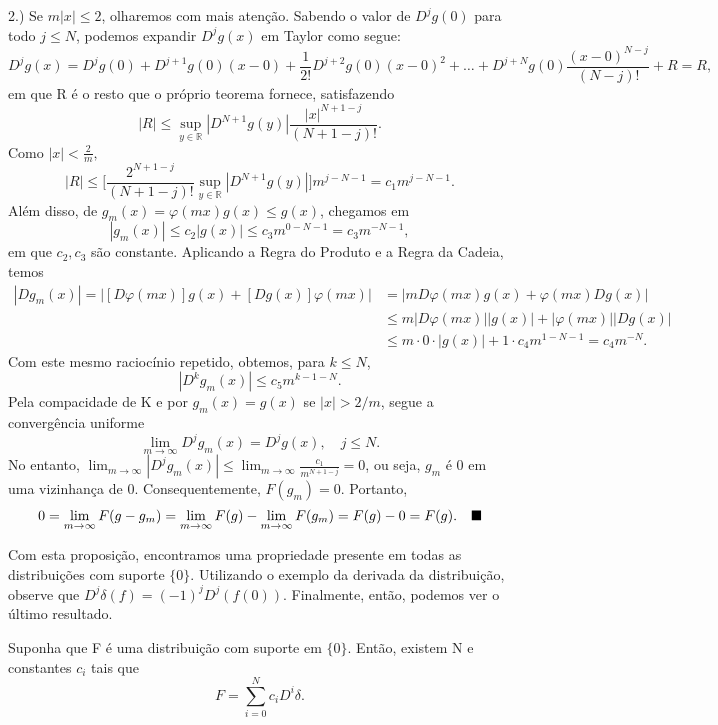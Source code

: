 \documentclass[MeasureTheory/measure_theory.tex]{subfiles}
\begin{document}
\begin{proof*}
	2.) Se \(m|x| \leq 2 \), olharemos com mais atenção. Sabendo o valor de \(D^{j}g(0)\) para todo \(j\leq N\), podemos expandir \(D^{j}g(x)\) em Taylor como segue:
	\[
		D^{j}g(x) = D^{j}g(0) + D^{j+1}g(0)(x-0) + \frac{1}{2!}D^{j+2}g(0)(x-0)^{2} + \dotsc + D^{j+N}g(0)\frac{(x-0)^{N-j}}{(N-j)!} + R = R,
	\]
	em que R é o resto que o próprio teorema fornece, satisfazendo
	\[
		|R|\leq \sup_{y\in \mathbb{R}}|D^{N+1}g(y)|\frac{|x|^{N+1-j}}{(N+1-j)!}.
	\]
	Como \(|x| < \frac{2}{m},\)
	\[
		|R|\leq \biggl[\frac{2^{N+1-j}}{(N+1-j)!}\sup_{y\in \mathbb{R}}|D^{N+1}g(y)|\biggr]m^{j-N-1} = c_{1}m^{j-N-1}.
	\]
	Além disso, de \(g_{m}(x) = \varphi (mx)g(x)\leq g(x)\), chegamos em
	\[
		|g_{m}(x)|\leq c_{2}|g(x)|\leq c_3m^{0 - N - 1} = c_{3}m^{-N-1},
	\]
	em que \(c_2, c_3\) são constante. Aplicando a Regra do Produto e a Regra da Cadeia, temos
	\begin{align*}
		|Dg_{m}(x)| = |[D\varphi (mx)]g(x) + [Dg(x)]\varphi (mx)| & = |mD\varphi(mx)g(x) + \varphi (mx)Dg(x)|                        \\
		                                                          & \leq m|D\varphi (mx)||g(x)|+|\varphi (mx)||Dg(x)|                \\
		                                                          & \leq m \cdot 0 \cdot |g(x)| + 1 \cdot c_4 m^{1-N-1} = c_4m^{-N}.
	\end{align*}
	Com este mesmo raciocínio repetido, obtemos, para \(k\leq N\),
	\[
		|D^{k}g_m(x)| \leq c_5m^{k-1-N}.
	\]
	Pela compacidade de K e por \(g_m(x) = g(x)\) se \(|x|>2/m\), segue a convergência uniforme
	\[
		\lim_{m\to \infty}D^{j}g_{m}(x) = D^{j}g(x),\quad j\leq N.
	\]
	No entanto, \(\lim_{m\to \infty}|D^{j}g_{m}(x)|\leq \lim_{m\to \infty}\frac{c_1}{m^{N+1-j}} = 0\), ou seja, \(g_m\) é 0 em uma vizinhança de 0. Consequentemente, \(F(g_m) = 0\). Portanto,
	\[
		0 = \lim_{m\to \infty}F(g-g_m) = \lim_{m\to \infty}F(g) - \lim_{m\to \infty}F(g_m) = F(g) - 0 = F(g).\quad \text{$\blacksquare$}
	\]
\end{proof*}
Com esta proposição, encontramos uma propriedade presente em todas as distribuições com suporte \(\{0\}.\) Utilizando o exemplo da derivada da distribuição, observe que \(D^{j}\delta (f) = (-1)^{j}D^{j}(f(0)).\)
Finalmente, então, podemos ver o último resultado.
\begin{theorem*}
	Suponha que F é uma distribuição com suporte em \(\{0\}.\) Então, existem N e constantes \(c_{i}\) tais que
	\[
		F = \sum\limits_{i=0}^{N}c_{i}D^{i}\delta .
	\]
\end{theorem*}
\end{document}
